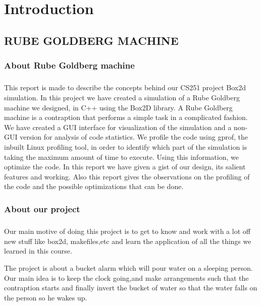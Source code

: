 \chapter{Introduction}
\section{RUBE GOLDBERG MACHINE}
\subsection{About Rube Goldberg machine}
\paragraph{}
This report is made to describe the concepts behind our CS251
project Box2d simulation.
 In this project we have created a simulation of a Rube Goldberg machine we designed, in C++ using the Box2D library.
 A Rube Goldberg machine is a contraption that performs a simple task in a complicated fashion.
 We have created a GUI interface for visualization of the simulation and a non-GUI version for analysis of code statistics. We profile the code using gprof, the inbuilt Linux profiling tool, in order to identify which part of the simulation is taking the maximum amount of time to execute. Using this information, we optimize the code. In this report we have given a gist of our design, its salient features and working. Also this report gives the observations on the profiling of the code and the possible optimizations that can be done.
 
 
 

\subsection{About our project}
\paragraph{}

Our main motive of doing this project is to get to know and work with a lot off new stuff like box2d, makefiles,etc and learn the application of all the things we learned in this course.

The project is about a bucket alarm which will pour water on a sleeping person.
Our main idea is to keep the clock going,and make arrangements such that the contraption starts and finally invert the bucket of water so that the water falls on the person so he wakes up.

